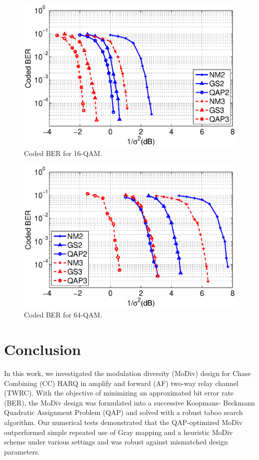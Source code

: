 \documentclass{article}
\begin{document}
\begin{figure}[htb]
  \centering
  \includegraphics[width=\columnwidth]{./figs/waterfall_16QAM.eps}
  \caption{Coded BER for 16-QAM.}
  \label{fig:coded_16QAM}
\end{figure}

\begin{figure}[htb]
  \centering
  \includegraphics[width=\columnwidth]{./figs/waterfall_64QAM.eps}
  \caption{Coded BER for 64-QAM.}
  \label{fig:coded_64QAM}
\end{figure}

\section{Conclusion}
\label{sec:conclusion}
In this work, we investigated the modulation diversity (MoDiv) design for
Chase Combining (CC) HARQ in amplify and forward (AF) two-way relay channel
(TWRC). With the objective of minimizing an approximated
bit error rate (BER), the MoDiv design was formulated into a successive Koopmans-
Beckmann Quadratic Assignment Problem (QAP) and solved with a robust taboo
search algorithm. Our numerical tests demonstrated that the QAP-optimized MoDiv
outperformed simple repeated use of Gray mapping and a heuristic MoDiv scheme
under various settings and was robust against mismatched design parameters.
\end{document}

